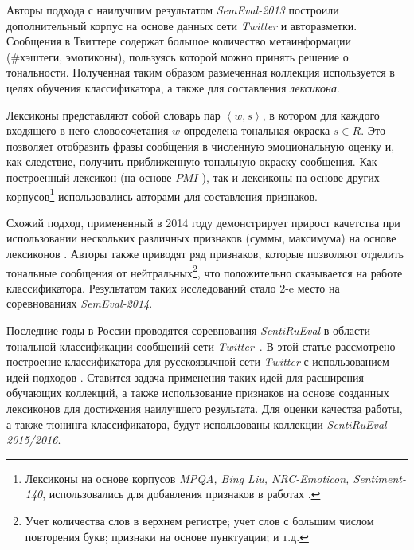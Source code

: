     Авторы подхода с наилучшим результатом {\it SemEval-2013} \cite{tonalityAnalysis}
    построили дополнительный корпус на основе данных сети {\it Twitter} и
    авторазметки.
    Сообщения в Твиттере содержат большое количество метаинформации (\#хэштеги,
    эмотиконы), пользуясь которой можно принять решение о тональности.
    Полученная таким образом размеченная коллекция используется в целях
    обучения классификатора, а также для составления {\it лексикона}.

    Лексиконы представляют собой словарь пар $\left<w, s\right>$, в котором для каждого
    входящего в него словосочетания $w$ определена тональная окраска $s \in R$.
    Это позволяет отобразить фразы сообщения в численную эмоциональную оценку и,
    как следствие, получить приближенную тональную окраску сообщения.
    Как построенный лексикон (на основе $PMI$ \cite{lexiconSO}), так и лексиконы
    на основе других корпусов\footnote{
        Лексиконы на основе корпусов {\it MPQA, Bing Liu, NRC-Emoticon, Sentiment-140},
        использовались для добавления признаков в работах
        \cite{tonalityAnalysis,modernApproach}.
    }
    использовались авторами \cite{tonalityAnalysis} для составления признаков.

    Схожий подход, примененный в 2014 году демонстрирует прирост качетства при
    использовании нескольких различных признаков (суммы, максимума) на основе
    лексиконов \cite{modernApproach}.
    Авторы также приводят ряд признаков, которые позволяют отделить тональные
    сообщения от нейтральных\footnote{
        Учет количества слов в верхнем регистре;
        учет слов с большим числом повторения букв;
        признаки на основе пунктуации;
        и т.д.
    }, что положительно сказывается на работе классификатора.
    Результатом таких исследований стало 2-e место на соревнованиях {\it SemEval-2014}.

    Последние годы в России проводятся соревнования {\it SentiRuEval} в области
    тональной классификации сообщений сети {\it Twitter}~\cite{dialog2015,dialog2016}.
    В этой статье рассмотрено построение классификатора для русскоязычной сети
    {\it Twitter} с использованием идей подходов \cite{tonalityAnalysis, modernApproach}.
    Ставится задача применения таких идей для расширения обучающих коллекций,
    а также использование признаков на основе созданных лексиконов для
    достижения наилучшего результата.
    Для оценки качества работы, а также тюнинга классификатора, будут
    использованы коллекции {\it SentiRuEval-2015/2016}.
